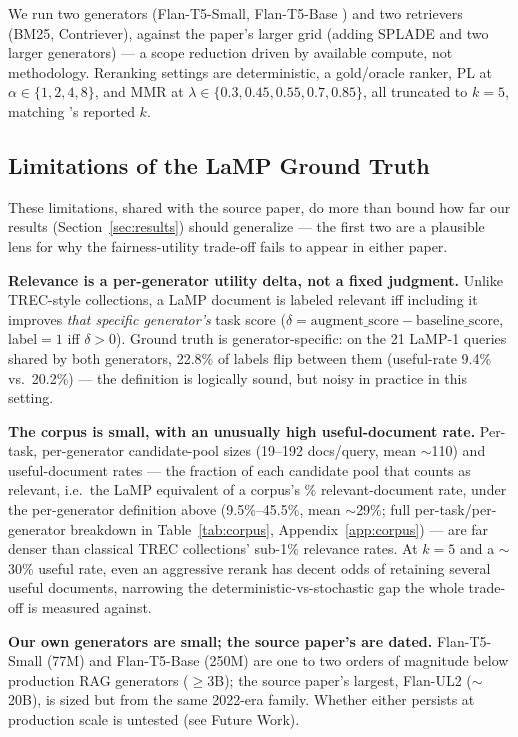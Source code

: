\documentclass[10pt,twocolumn]{article}
\begin{document}
We run two generators (Flan-T5-Small, Flan-T5-Base \cite{chung2024scaling}) and two
retrievers (BM25, Contriever), against the paper's larger grid (adding SPLADE and
two larger generators) --- a scope reduction driven by available compute, not
methodology. Reranking settings are deterministic, a gold/oracle ranker, PL at
$\alpha \in \{1,2,4,8\}$, and MMR at $\lambda \in \{0.3,0.45,0.55,0.7,0.85\}$, all
truncated to $k=5$, matching \cite{eunkim2025fairrag}'s reported $k$.

\subsection{Limitations of the LaMP Ground Truth}
\label{sec:threats}

These limitations, shared with the source paper, do more than bound how far our
results (Section~\ref{sec:results}) should generalize --- the first two are a
plausible lens for why the fairness-utility trade-off fails to appear in either
paper.

\textbf{Relevance is a per-generator utility delta, not a fixed judgment.} Unlike
TREC-style collections, a LaMP document is labeled relevant iff including it
improves \emph{that specific generator's} task score
($\delta{=}\text{augment\_score}{-}\text{baseline\_score}$, label${=}1$ iff
$\delta{>}0$). Ground truth is generator-specific: on the 21 LaMP-1 queries shared
by both generators, 22.8\% of labels flip between them (useful-rate 9.4\% vs.\
20.2\%) --- the definition is logically sound, but noisy in practice in this
setting.

\textbf{The corpus is small, with an unusually high useful-document rate.}
Per-task, per-generator candidate-pool sizes (19--192 docs/query, mean $\sim$110)
and useful-document rates --- the fraction of each candidate pool that counts as
relevant, i.e.\ the LaMP equivalent of a corpus's \% relevant-document rate, under
the per-generator definition above (9.5\%--45.5\%, mean $\sim$29\%; full
per-task/per-generator breakdown in Table~\ref{tab:corpus},
Appendix~\ref{app:corpus}) --- are far denser than classical TREC collections'
sub-1\% relevance rates. At $k{=}5$ and a $\sim$30\% useful rate, even an
aggressive rerank has decent odds of retaining several useful documents, narrowing
the deterministic-vs-stochastic gap the whole trade-off is measured against.

\textbf{Our own generators are small; the source paper's are dated.} Flan-T5-Small
(77M) and Flan-T5-Base (250M) are one to two orders of magnitude below production
RAG generators ($\geq$3B); the source paper's largest, Flan-UL2 ($\sim$20B), is
sized but from the same 2022-era family. Whether either persists at production
scale is untested (see Future Work).
\end{document}
